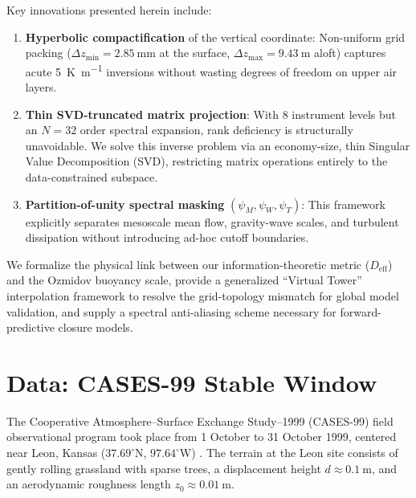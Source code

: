 \documentclass[11pt,a4paper]{article}
\begin{document}
Key innovations presented herein include:
\begin{enumerate}
    \item \textbf{Hyperbolic compactification} of the vertical coordinate: Non-uniform grid packing ($\Delta z_{\min} = \SI{2.85}{\milli\meter}$ at the surface, $\Delta z_{\max} = \SI{9.43}{\meter}$ aloft) captures acute \SI{5}{\kelvin\per\meter} inversions without wasting degrees of freedom on upper air layers.
    \item \textbf{Thin SVD-truncated matrix projection}: With 8 instrument levels but an $N=32$ order spectral expansion, rank deficiency is structurally unavoidable. We solve this inverse problem via an economy-size, thin Singular Value Decomposition (SVD), restricting matrix operations entirely to the data-constrained subspace.
    \item \textbf{Partition-of-unity spectral masking} $(\psi_M, \psi_W, \psi_T)$: This framework explicitly separates mesoscale mean flow, gravity-wave scales, and turbulent dissipation without introducing ad-hoc cutoff boundaries.
\end{enumerate}

We formalize the physical link between our information-theoretic metric ($D_{\mathrm{eff}}$) and the Ozmidov buoyancy scale, provide a generalized ``Virtual Tower'' interpolation framework to resolve the grid-topology mismatch for global model validation, and supply a spectral anti-aliasing scheme necessary for forward-predictive closure models. \section{Data: CASES-99 Stable Window}
\label{sec:data}

The Cooperative Atmosphere--Surface Exchange Study--1999 (CASES-99) field observational program took place from 1 October to 31 October 1999, centered near Leon, Kansas ($37.69^\circ\text{N}$, $97.64^\circ\text{W}$) \citep{Poulos2002}. The terrain at the Leon site consists of gently rolling grassland with sparse trees, a displacement height $d \approx \SI{0.1}{\meter}$, and an aerodynamic roughness length $z_0 \approx \SI{0.01}{\meter}$.
\end{document}

